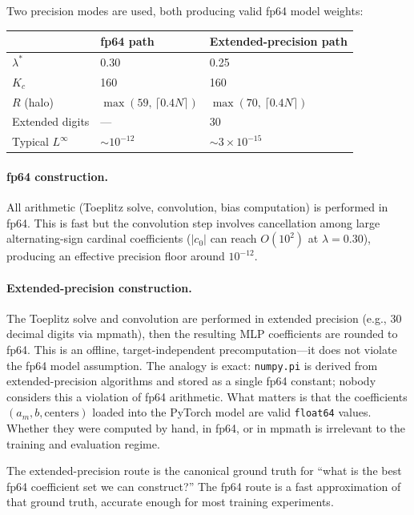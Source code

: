\documentclass{article}
\begin{document}
Two precision modes are used, both producing valid fp64 model weights:

\begin{center}
\small
\begin{tabular}{@{}lll@{}}
\toprule
  & \textbf{fp64 path} & \textbf{Extended-precision path} \\
\midrule
\(\lambda^*\)         & 0.30 & 0.25 \\
\(K_c\)               & 160  & 160  \\
\(R\) (halo)          & \(\max(59,\,\lceil 0.4N\rceil)\) & \(\max(70,\,\lceil 0.4N\rceil)\) \\
Extended digits       & ---  & 30   \\
Typical \(L^\infty\)  & \(\sim 10^{-12}\) & \(\sim 3\times 10^{-15}\) \\
\bottomrule
\end{tabular}
\end{center}

\paragraph{fp64 construction.}
All arithmetic (Toeplitz solve, convolution, bias computation) is performed in fp64.  This is fast but the convolution step involves cancellation among large alternating-sign cardinal coefficients (\(|c_0|\) can reach \(O(10^2)\) at \(\lambda = 0.30\)), producing an effective precision floor around \(10^{-12}\).

\paragraph{Extended-precision construction.}
The Toeplitz solve and convolution are performed in extended precision (e.g., 30 decimal digits via mpmath), then the resulting MLP coefficients are rounded to fp64.  This is an offline, target-independent precomputation---it does not violate the fp64 model assumption.  The analogy is exact: \texttt{numpy.pi} is derived from extended-precision algorithms and stored as a single fp64 constant; nobody considers this a violation of fp64 arithmetic.  What matters is that the coefficients \((a_m, b, \text{centers})\) loaded into the PyTorch model are valid \texttt{float64} values.  Whether they were computed by hand, in fp64, or in mpmath is irrelevant to the training and evaluation regime.

The extended-precision route is the canonical ground truth for ``what is the best fp64 coefficient set we can construct?''  The fp64 route is a fast approximation of that ground truth, accurate enough for most training experiments.
\end{document}
